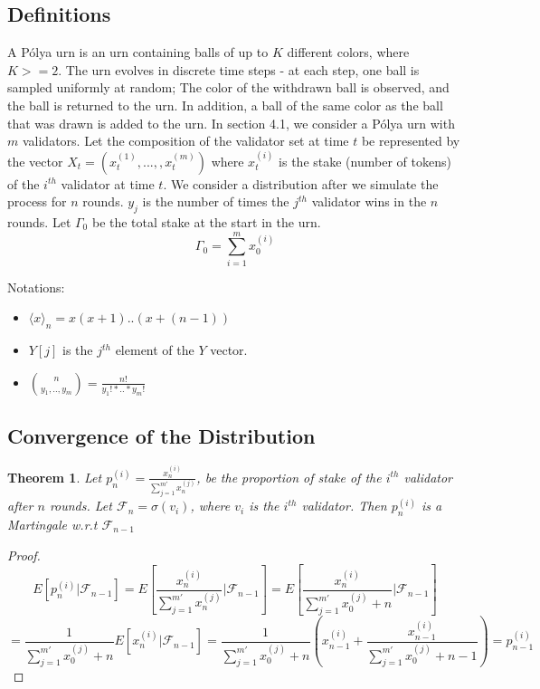 \documentclass{article}
\newtheorem{theorem}{Theorem}[subsection]
\renewcommand{\|}{\;|\;}
\begin{document}
\subsection*{Definitions}
A P\'olya urn is an urn containing balls of up to $K$ different colors, where $K>=2$. The urn evolves in discrete time steps - at each step, one ball is sampled uniformly at random; The color of the withdrawn ball is observed, and the ball is returned to the urn. In addition, a ball of the same color as the ball that was drawn is added to the urn. 
\newline \newline
In section 4.1, we consider a P\'olya urn with $m$ validators. Let the composition of the validator set at time $t$ be represented by the vector $X_t = (x_t^{(1)},..., , x_t^{(m)})$ where  $x_t^{(i)}$ is the stake (number of tokens) of the $i^{th}$ validator at time $t$. We consider a distribution after we simulate the process for $n$ rounds. $y_j$ is the number of times the $j^{th}$ validator wins in the $n$ rounds. Let $\Gamma_0$ be the total stake at the start in the urn.
\begin{equation*}
        \Gamma_0 = \sum_{i = 1}^{m}{x_0^{(i)}}
\end{equation*}

Notations:
\begin{itemize}
    \item $\langle x \rangle_n = x(x + 1)..(x + (n - 1)) $
    \item $Y[j]$ is the $j^{th}$ element of the $Y$ vector.
    \item ${n \choose y_1,.., y_m} = \frac{n!}{y_1!*..*y_m!}$
\end{itemize}

\subsection{Convergence of the Distribution}
\begin{theorem}
Let $p_n^{(i)} = \frac{x_n^{(i)}}{\sum_{j = 1}^{m'}x_n^{(j)}}$, be the proportion of stake of the $i^{th}$ validator after $n$ rounds. Let $\mathcal{F}_n =  \sigma{(v_i)}$, where $v_i$ is the $i^{th}$ validator. Then $p_n^{(i)}$ is a Martingale w.r.t $\mathcal{F}_{n-1}$
\end{theorem}
\begin{proof}
\begin{equation*}
    E[p_n^{(i)}|\mathcal{F}_{n-1}] = E[\frac{x_n^{(i)}}{\sum_{j = 1}^{m'}x_n^{(j)}}|\mathcal{F}_{n-1}] = E[\frac{x_n^{(i)}}{\sum_{j = 1}^{m'}x_0^{(j)} + n}|\mathcal{F}_{n-1}] 
\end{equation*}
\begin{equation*}
    = \frac{1}{\sum_{j = 1}^{m'}x_0^{(j)} + n} E[x_n^{(i)}|\mathcal{F}_{n-1}] =  \frac{1}{\sum_{j = 1}^{m'}x_0^{(j)} + n}(x_{n-1}^{(i)} + \frac{x_{n-1}^{(i)}}{\sum_{j = 1}^{m'}x_{0}^{(j)} + n - 1}) = p_{n-1}^{(i)}
\end{equation*}
\end{proof}
\end{document}
